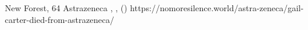           {New Forest, }
          {64}
          {Astrazeneca}
          {}
          {
            ,
            ,
             ()
          }
          {https://nomoresilence.world/astra-zeneca/gail-carter-died-from-astrazeneca/}

